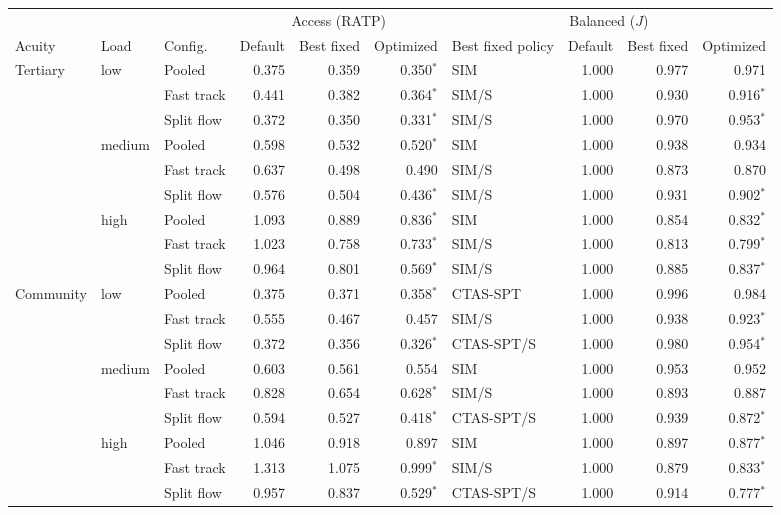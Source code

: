 \begin{tabular}{lllrrrlrrr}
\toprule
 & & & \multicolumn{3}{c}{Access (RATP)} & \multicolumn{4}{c}{Balanced ($J$)} \\
\cmidrule(lr){4-6}\cmidrule(lr){7-10}
Acuity & Load & Config. & Default & Best fixed & Optimized & Best fixed policy & Default & Best fixed & Optimized \\
\midrule
Tertiary & low & Pooled & 0.375 & 0.359 & 0.350$^{*}$ & SIM & 1.000 & 0.977 & 0.971 \\
 &  & Fast track & 0.441 & 0.382 & 0.364$^{*}$ & SIM/S & 1.000 & 0.930 & 0.916$^{*}$ \\
 &  & Split flow & 0.372 & 0.350 & 0.331$^{*}$ & SIM/S & 1.000 & 0.970 & 0.953$^{*}$ \\
 & medium & Pooled & 0.598 & 0.532 & 0.520$^{*}$ & SIM & 1.000 & 0.938 & 0.934 \\
 &  & Fast track & 0.637 & 0.498 & 0.490 & SIM/S & 1.000 & 0.873 & 0.870 \\
 &  & Split flow & 0.576 & 0.504 & 0.436$^{*}$ & SIM/S & 1.000 & 0.931 & 0.902$^{*}$ \\
 & high & Pooled & 1.093 & 0.889 & 0.836$^{*}$ & SIM & 1.000 & 0.854 & 0.832$^{*}$ \\
 &  & Fast track & 1.023 & 0.758 & 0.733$^{*}$ & SIM/S & 1.000 & 0.813 & 0.799$^{*}$ \\
 &  & Split flow & 0.964 & 0.801 & 0.569$^{*}$ & SIM/S & 1.000 & 0.885 & 0.837$^{*}$ \\
Community & low & Pooled & 0.375 & 0.371 & 0.358$^{*}$ & CTAS-SPT & 1.000 & 0.996 & 0.984 \\
 &  & Fast track & 0.555 & 0.467 & 0.457 & SIM/S & 1.000 & 0.938 & 0.923$^{*}$ \\
 &  & Split flow & 0.372 & 0.356 & 0.326$^{*}$ & CTAS-SPT/S & 1.000 & 0.980 & 0.954$^{*}$ \\
 & medium & Pooled & 0.603 & 0.561 & 0.554 & SIM & 1.000 & 0.953 & 0.952 \\
 &  & Fast track & 0.828 & 0.654 & 0.628$^{*}$ & SIM/S & 1.000 & 0.893 & 0.887 \\
 &  & Split flow & 0.594 & 0.527 & 0.418$^{*}$ & CTAS-SPT/S & 1.000 & 0.939 & 0.872$^{*}$ \\
 & high & Pooled & 1.046 & 0.918 & 0.897 & SIM & 1.000 & 0.897 & 0.877$^{*}$ \\
 &  & Fast track & 1.313 & 1.075 & 0.999$^{*}$ & SIM/S & 1.000 & 0.879 & 0.833$^{*}$ \\
 &  & Split flow & 0.957 & 0.837 & 0.529$^{*}$ & CTAS-SPT/S & 1.000 & 0.914 & 0.777$^{*}$ \\

\end{tabular}
